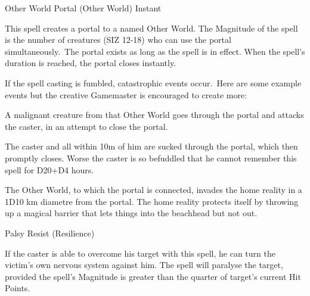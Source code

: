 \begin{rpg-spell}
{Other World Portal (Other World)}
{Instant}

This spell creates a portal to a named Other World. The Magnitude of the spell is the number of creatures (SIZ 12-18) who can use the portal simultaneously. The portal exists as long as the spell is in effect. When the spell’s duration is reached, the portal closes instantly. 

If the spell casting is fumbled, catastrophic events occur. Here are some example events but the creative Gamemaster is encouraged to create more:
\begin{rpg-list}
\item A malignant creature from that Other World goes through the portal and attacks the caster, in an attempt to close the portal. 
\item The caster and all within 10m of him are sucked through the portal, which then promptly closes. Worse the caster is so befuddled that he cannot remember this spell for D20+D4 hours.
\item The Other World, to which the portal is connected, invades the home reality in a 1D10 km diametre from the portal. The home reality protects itself by throwing up a magical barrier that lets things into the beachhead but not out. 
\end{rpg-list}
\end{rpg-spell}


\begin{rpg-spell}
{Palsy}
{Resist (Resilience)}

If the caster is able to overcome his target with this spell, he can turn the victim’s own nervous system against him. The spell will paralyse the target, provided the spell’s Magnitude is greater than the quarter of target’s current Hit Points. 
\end{rpg-spell}


